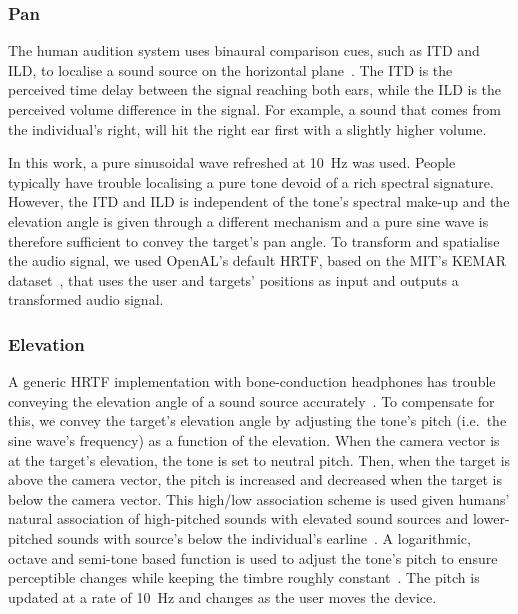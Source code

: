 \documentclass{llncs}
\begin{document}
\subsubsection{Pan}

The human audition system uses binaural comparison cues, such as ITD and ILD, to localise a sound source on the horizontal plane~\cite{blauert1969sound}.
The ITD is the perceived time delay between the signal reaching both ears, while the ILD is the perceived volume difference in the signal.
For example, a sound that comes from the individual's right, will hit the right ear first with a slightly higher volume.

In this work, a pure sinusoidal wave refreshed at \SI{10}{\hertz} was used. 
People typically have trouble localising a pure tone devoid of a rich spectral signature.
However, the ITD and ILD is independent of the tone's spectral make-up and the elevation angle is given through a different mechanism and a pure sine wave is therefore sufficient to convey the target's pan angle.
To transform and spatialise the audio signal, we used OpenAL's default HRTF, based on the MIT's KEMAR dataset~\cite{hiebert2005openal}, that uses the user and targets' positions as input and outputs a transformed audio signal.

\subsubsection{Elevation}

A generic HRTF implementation with bone-conduction headphones has trouble conveying the elevation angle of a sound source accurately~\cite{macdonald2006spatial,schonstein2008comparison}.
To compensate for this, we convey the target's elevation angle by adjusting the tone's pitch (i.e.\ the sine wave's frequency) as a function of the elevation. 
When the camera vector is at the target's elevation, the tone is set to neutral pitch.
Then, when the target is above the camera vector, the pitch is increased and decreased when the target is below the camera vector.
This high/low association scheme is used given humans' natural association of high-pitched sounds with elevated sound sources and lower-pitched sounds with source's below the individual's earline~\cite{pratt1930spatial,blauert1997spatial}.
A logarithmic, octave and semi-tone based function is used to adjust the tone's pitch to ensure perceptible changes while keeping the timbre roughly constant~\cite{shepard1964circularity}.
The pitch is updated at a rate of \SI{10}{\hertz} and changes as the user moves the device.
\end{document}
